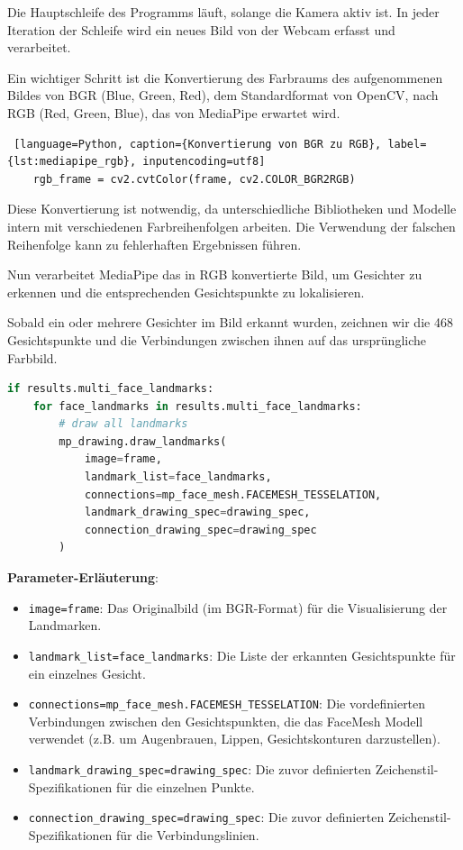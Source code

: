 Die Hauptschleife des Programms läuft, solange die Kamera aktiv ist. In jeder Iteration der Schleife wird ein neues Bild von der Webcam erfasst und verarbeitet.

Ein wichtiger Schritt ist die Konvertierung des Farbraums des aufgenommenen Bildes von BGR (Blue, Green, Red), dem Standardformat von OpenCV, nach RGB (Red, Green, Blue), das von MediaPipe erwartet wird.
\begin{lstlisting} [language=Python, caption={Konvertierung von BGR zu RGB}, label={lst:mediapipe_rgb}, inputencoding=utf8]
    rgb_frame = cv2.cvtColor(frame, cv2.COLOR_BGR2RGB)
\end{lstlisting}
Diese Konvertierung ist notwendig, da unterschiedliche Bibliotheken und Modelle intern mit verschiedenen Farbreihenfolgen arbeiten. Die Verwendung der falschen Reihenfolge kann zu fehlerhaften Ergebnissen führen.

Nun verarbeitet MediaPipe das in RGB konvertierte Bild, um Gesichter zu erkennen und die entsprechenden Gesichtspunkte zu lokalisieren.

Sobald ein oder mehrere Gesichter im Bild erkannt wurden, zeichnen wir die 468 Gesichtspunkte und die Verbindungen zwischen ihnen auf das ursprüngliche Farbbild.
\begin{lstlisting}[language=Python, caption={Zeichnen der Gesichtspunkte}, label={lst:mediapipe_drawing}, inputencoding=utf8]
    if results.multi_face_landmarks:
    for face_landmarks in results.multi_face_landmarks:
        # draw all landmarks
        mp_drawing.draw_landmarks(
            image=frame,
            landmark_list=face_landmarks,
            connections=mp_face_mesh.FACEMESH_TESSELATION,
            landmark_drawing_spec=drawing_spec,
            connection_drawing_spec=drawing_spec
        )
\end{lstlisting}
\textbf{Parameter-Erläuterung}:
\begin{itemize}
    \item \texttt{image=frame}: Das Originalbild (im BGR-Format) für die Visualisierung der Landmarken.
    \item \texttt{landmark\_list=face\_landmarks}: Die Liste der erkannten Gesichtspunkte für ein einzelnes Gesicht.
    \item \texttt{connections=mp\_face\_mesh.FACEMESH\_TESSELATION}: Die vordefinierten Verbindungen zwischen den Gesichtspunkten, die das FaceMesh Modell verwendet (z.B. um Augenbrauen, Lippen, Gesichtskonturen darzustellen).
    \item \texttt{landmark\_drawing\_spec=drawing\_spec}: Die zuvor definierten Zeichenstil-Spezifikationen für die einzelnen Punkte.
    \item \texttt{connection\_drawing\_spec=drawing\_spec}: Die zuvor definierten Zeichenstil-Spezifikationen für die Verbindungslinien.
\end{itemize}

